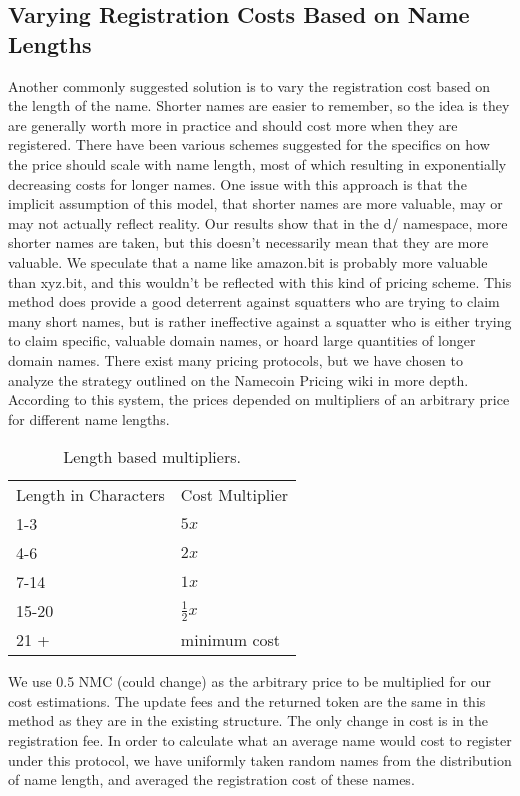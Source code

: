 \subsection{Varying Registration Costs Based on Name Lengths}
    Another commonly suggested solution is to vary the registration cost based on the length of the name. Shorter names are easier to remember, so the idea is they are generally worth more in practice and should cost more when they are registered. There have been various schemes suggested for the specifics on how the price should scale with name length, most of which resulting in exponentially decreasing costs for longer names. One issue with this approach is that the implicit assumption of this model, that shorter names are more valuable, may or may not actually reflect reality. Our results show that in the d/ namespace, more shorter names are taken, but this doesn't necessarily mean that they are more valuable. We speculate that a name like amazon.bit is probably more valuable than xyz.bit, and this wouldn't be reflected with this kind of pricing scheme.  This method does provide a good deterrent against squatters who are trying to claim many short names, but is rather ineffective against a squatter who is either trying to claim specific, valuable domain names, or hoard large quantities of longer domain names. 
    There exist many pricing protocols, but we have chosen to analyze the strategy outlined on the Namecoin Pricing wiki in more depth. According to this system, the prices depended on multipliers of an arbitrary price for different name lengths. 


\begin{table}[t]
  \centering
  \begin{tabular}{| l | l |} \hline
    Length in Characters & Cost Multiplier \\
    1-3 & \( 5 x \) \\
    4-6 & \( 2 x \) \\
    7-14 & \( 1 x \) \\
    15-20 & \( \frac{1}{2} x \) \\
    21 + & minimum cost \\ \hline
  \end{tabular}
  \caption{Length based multipliers.}
\end{table}




    We use 0.5 NMC (could change) as the arbitrary price to be multiplied for our cost estimations. The update fees and the returned token are the same in this method as they are in the existing structure. The only change in cost is in the registration fee. In order to calculate what an average name would cost to register under this protocol, we have uniformly taken random names from the distribution of name length, and averaged the registration cost of these names. 



